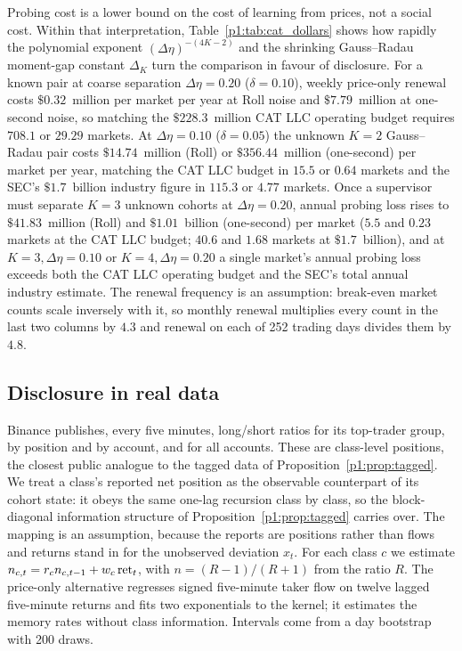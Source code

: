 \begin{table}[t]
\begin{threeparttable}
\end{threeparttable}
\end{table}

Probing cost is a lower bound on the cost of learning from prices, not a social cost. Within that interpretation, Table~\ref{p1:tab:cat_dollars} shows how rapidly the polynomial exponent $(\Delta\eta)^{-(4K-2)}$ and the shrinking Gauss--Radau moment-gap constant $\Delta_K$ turn the comparison in favour of disclosure. For a known pair at coarse separation $\Delta\eta=0.20$ ($\delta=0.10$), weekly price-only renewal costs $\$0.32$~million per market per year at Roll noise and $\$7.79$~million at one-second noise, so matching the $\$228.3$~million CAT LLC operating budget requires $708.1$ or $29.29$ markets. At $\Delta\eta=0.10$ ($\delta=0.05$) the unknown $K=2$ Gauss--Radau pair costs $\$14.74$~million (Roll) or $\$356.44$~million (one-second) per market per year, matching the CAT LLC budget in $15.5$ or $0.64$ markets and the SEC's $\$1.7$~billion industry figure in $115.3$ or $4.77$ markets. Once a supervisor must separate $K=3$ unknown cohorts at $\Delta\eta=0.20$, annual probing loss rises to $\$41.83$~million (Roll) and $\$1.01$~billion (one-second) per market ($5.5$ and $0.23$ markets at the CAT LLC budget; $40.6$ and $1.68$ markets at $\$1.7$~billion), and at $K=3, \Delta\eta=0.10$ or $K=4, \Delta\eta=0.20$ a single market's annual probing loss exceeds both the CAT LLC operating budget and the SEC's total annual industry estimate. The renewal frequency is an assumption: break-even market counts scale inversely with it, so monthly renewal multiplies every count in the last two columns by $4.3$ and renewal on each of 252 trading days divides them by $4.8$.

\subsection{Disclosure in real data}\label{p1:sec:disc_data}

Binance publishes, every five minutes, long/short ratios for its top-trader group, by position and by account, and for all accounts. These are class-level positions, the closest public analogue to the tagged data of Proposition~\ref{p1:prop:tagged}. We treat a class's reported net position as the observable counterpart of its cohort state: it obeys the same one-lag recursion class by class, so the block-diagonal information structure of Proposition~\ref{p1:prop:tagged} carries over. The mapping is an assumption, because the reports are positions rather than flows and returns stand in for the unobserved deviation $x_t$. For each class $c$ we estimate $n_{c,t}=r_cn_{c,t-1}+w_c\,{\rm ret}_t$, with $n=(R-1)/(R+1)$ from the ratio $R$. The price-only alternative regresses signed five-minute taker flow on twelve lagged five-minute returns and fits two exponentials to the kernel; it estimates the memory rates without class information. Intervals come from a day bootstrap with 200 draws.


